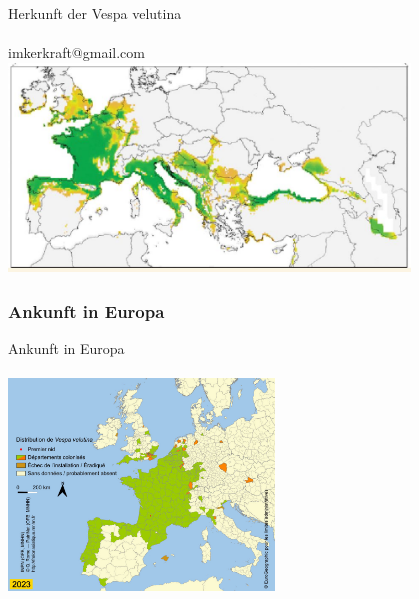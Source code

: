 \documentclass[aspectratio=169]{beamer}
\begin{document}
\begin{frame}{Herkunft der Vespa velutina}
	\framesubtitle{} 

		\begin{center}	
			imkerkraft@gmail.com\includegraphics[width=0.8\textwidth]{figures/Herkunft_2.jpg}
		\end{center}
\end{frame}

\subsubsection[Ankunft in Europa]{Ankunft in Europa}

\begin{frame}{Ankunft in Europa}
	\framesubtitle{}

		\begin{center}	
			\includegraphics[width=0.53\textwidth]{figures/Progression_Invasion_Vespa_velutina-Q_Rome_MNHN2023b.jpg}
		\end{center}
\end{frame}
\end{document}
